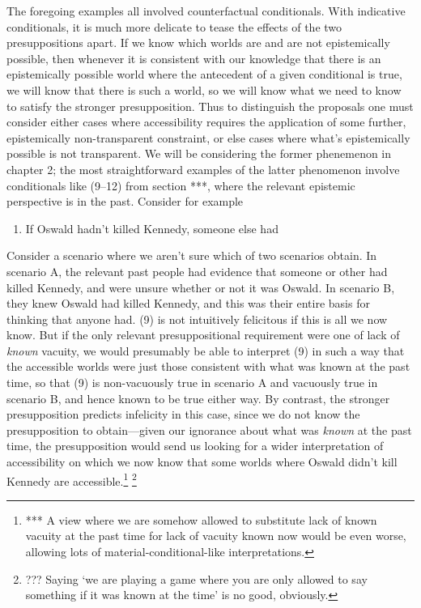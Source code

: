 The foregoing examples all involved counterfactual conditionals. With
indicative conditionals, it is much more delicate to tease the effects
of the two presuppositions apart. If we know which worlds are and are
not epistemically possible, then whenever it is consistent with our
knowledge that there is an epistemically possible world where the
antecedent of a given conditional is true, we will know that there is
such a world, so we will know what we need to know to satisfy the
stronger presupposition. Thus to distinguish the proposals one must
consider either cases where accessibility requires the application of
some further, epistemically non-transparent constraint, or else cases
where what's epistemically possible is not transparent. We will be
considering the former phenemenon in chapter 2; the most straightforward
examples of the latter phenomenon involve conditionals like (9--12) from
section ***, where the relevant epistemic perspective is in the past.
Consider for example

\begin{enumerate}
\def\labelenumi{(\arabic{enumi})}
\setcounter{enumi}{8}
\itemsep1pt\parskip0pt
\item
  If Oswald hadn't killed Kennedy, someone else had
\end{enumerate}

Consider a scenario where we aren't sure which of two scenarios obtain.
In scenario A, the relevant past people had evidence that someone or
other had killed Kennedy, and were unsure whether or not it was Oswald.
In scenario B, they knew Oswald had killed Kennedy, and this was their
entire basis for thinking that anyone had. (9) is not intuitively
felicitous if this is all we now know. But if the only relevant
presuppositional requirement were one of lack of \emph{known} vacuity,
we would presumably be able to interpret (9) in such a way that the
accessible worlds were just those consistent with what was known at the
past time, so that (9) is non-vacuously true in scenario A and vacuously
true in scenario B, and hence known to be true either way. By contrast,
the stronger presupposition predicts infelicity in this case, since we
do not know the presupposition to obtain---given our ignorance about
what was \emph{known} at the past time, the presupposition would send us
looking for a wider interpretation of accessibility on which we now know
that some worlds where Oswald didn't kill Kennedy are
accessible.\footnote{*** A view where we are somehow allowed to
  substitute lack of known vacuity at the past time for lack of vacuity
  known now would be even worse, allowing lots of
  material-conditional-like interpretations.} \footnote{??? Saying `we
  are playing a game where you are only allowed to say something if it
  was known at the time' is no good, obviously.}

